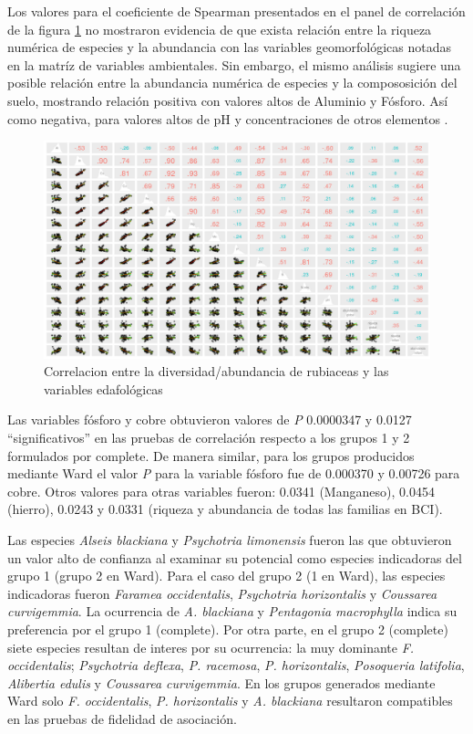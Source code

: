\documentclass[11pt,]{article}
\begin{document}
Los valores para el coeficiente de Spearman presentados en el panel de
correlación de la figura \ref{fig:panel_cor_suelo_abun_riq_rubic} no
mostraron evidencia de que exista relación entre la riqueza numérica de
especies y la abundancia con las variables geomorfológicas notadas en la
matríz de variables ambientales. Sin embargo, el mismo análisis sugiere
una posible relación entre la abundancia numérica de especies y la
compososición del suelo, mostrando relación positiva con valores altos
de Aluminio y Fósforo. Así como negativa, para valores altos de pH y
concentraciones de otros elementos .

\begin{figure}
\centering
\includegraphics{panel_cor_suelo_abun_riq_rubic_spear.png}
\caption{Correlacion entre la diversidad/abundancia de rubiaceas y las
variables edafológicas \label{fig:panel_cor_suelo_abun_riq_rubic}}
\end{figure}

Las variables fósforo y cobre obtuvieron valores de \emph{P} 0.0000347 y
0.0127 ``significativos'' en las pruebas de correlación respecto a los
grupos 1 y 2 formulados por complete. De manera similar, para los grupos
producidos mediante Ward el valor \emph{P} para la variable fósforo fue
de 0.000370 y 0.00726 para cobre. Otros valores para otras variables
fueron: 0.0341 (Manganeso), 0.0454 (hierro), 0.0243 y 0.0331 (riqueza y
abundancia de todas las familias en BCI).

Las especies \emph{Alseis blackiana} y \emph{Psychotria limonensis}
fueron las que obtuvieron un valor alto de confianza al examinar su
potencial como especies indicadoras del grupo 1 (grupo 2 en Ward). Para
el caso del grupo 2 (1 en Ward), las especies indicadoras fueron
\emph{Faramea occidentalis}, \emph{Psychotria horizontalis} y
\emph{Coussarea curvigemmia}. La ocurrencia de \emph{A. blackiana} y
\emph{Pentagonia macrophylla} indica su preferencia por el grupo 1
(complete). Por otra parte, en el grupo 2 (complete) siete especies
resultan de interes por su ocurrencia: la muy dominante \emph{F.
occidentalis}; \emph{Psychotria deflexa}, \emph{P. racemosa}, \emph{P.
horizontalis}, \emph{Posoqueria latifolia}, \emph{Alibertia edulis} y
\emph{Coussarea curvigemmia}. En los grupos generados mediante Ward solo
\emph{F. occidentalis}, \emph{P. horizontalis} y \emph{A. blackiana}
resultaron compatibles en las pruebas de fidelidad de asociación.
\end{document}
